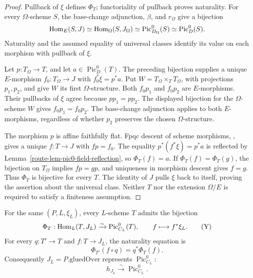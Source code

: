 \begin{proof}
  Pullback of \(\xi\) defines \(\Phi_T\); functoriality of pullback
  proves naturality. For every \(\Omega\)-scheme \(S\), the
  base-change adjunction, \(\beta\), and \(r_\Omega\) give a
  bijection
  \[
    \operatorname{Hom}_E(S,J)\simeq\operatorname{Hom}_\Omega(S,J_\Omega)
      \simeq\operatorname{Pic}^0_{D_\Omega}(S)
      \simeq\operatorname{Pic}^0_D(S).
  \]
  Naturality and the assumed equality of universal classes identify
  its value on each morphism with pullback of \(\xi\).

  Let \(p:T_\Omega\to T\), and let
  \(a\in\operatorname{Pic}^0_D(T)\). The preceding bijection supplies
  a unique \(E\)-morphism \(f_0:T_\Omega\to J\) with
  \(f_0^*\xi=p^*a\). Put \(W=T_\Omega\times_TT_\Omega\), with
  projections \(p_1,p_2\), and give \(W\) its first
  \(\Omega\)-structure. Both \(f_0p_1\) and \(f_0p_2\) are
  \(E\)-morphisms. Their pullbacks of \(\xi\) agree because
  \(pp_1=pp_2\). The displayed bijection for the
  \(\Omega\)-scheme \(W\) gives \(f_0p_1=f_0p_2\). The
  base-change adjunction applies to both \(E\)-morphisms, regardless
  of whether \(p_2\) preserves the chosen \(\Omega\)-structure.

  The morphism \(p\) is affine faithfully flat. Fpqc descent of
  scheme morphisms, \cite[Tag 040L]{stacks-project}, gives a unique
  \(f:T\to J\) with \(fp=f_0\). The equality
  \(p^*(f^*\xi)=p^*a\) is reflected by
  Lemma~\ref{route-lem-pic0-field-reflection}, so \(\Phi_T(f)=a\).
  If \(\Phi_T(f)=\Phi_T(g)\), the bijection on \(T_\Omega\)
  implies \(fp=gp\), and uniqueness in morphism descent gives
  \(f=g\). Thus \(\Phi_T\) is bijective for every \(T\).
  The identity of \(J\) pulls \(\xi\) back to itself, proving the
  assertion about the universal class. Neither \(T\) nor the
  extension \(\Omega/E\) is required to satisfy a finiteness
  assumption.
\end{proof}

\begin{theorem}
  \label{route-thm-finite-stage-yoneda}
  \notready

  For the same \((P,L,\xi_L)\), every \(L\)-scheme \(T\) admits the
  bijection
  \[
    \Phi_T:\operatorname{Hom}_L(T,J_L)\xrightarrow{\sim}
       \operatorname{Pic}^0_{C_L}(T),
    \qquad f\longmapsto f^*\xi_L.
    \tag{Y}
  \]
  For every \(q:T'\to T\) and \(f:T\to J_L\), the naturality equation is
  \[
    \Phi_{T'}(f\circ q)=q^*\Phi_T(f).
  \]
  Consequently \(J_L=P.\mathrm{gluedOver}\) represents
  \(\operatorname{Pic}^0_{C_L}\):
  \[
    h_{J_L}\xrightarrow{\sim}\operatorname{Pic}^0_{C_L}.
    \tag{FS-Rep}
  \]
\end{theorem}

